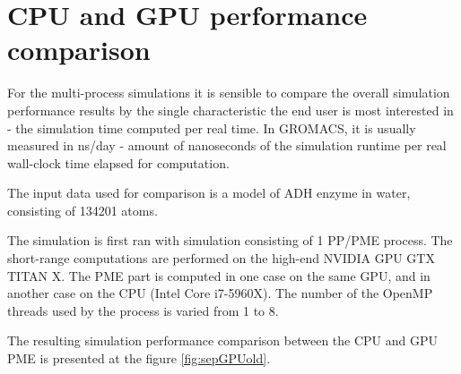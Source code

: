 \documentclass[12pt,a4paper]{report}
\begin{document}
\FloatBarrier

\section{CPU and GPU performance comparison}

For the multi-process simulations it is sensible to compare the overall simulation performance results by the single characteristic the end user is most interested in - the simulation time computed per real time. In GROMACS, it is usually measured in ns/day - amount of nanoseconds of the simulation runtime per real wall-clock time elapsed for computation.

The input data used for comparison is a model of ADH enzyme in water, consisting of 134201 atoms.

The simulation is first ran with simulation consisting of 1 PP/PME process. The short-range computations are performed on the high-end NVIDIA GPU GTX TITAN X.    
The PME part is computed in one case on the same GPU, and in another case on the CPU (Intel Core i7-5960X). The number of the OpenMP threads used by the process is varied from 1 to 8.
 
The resulting simulation performance comparison between the CPU and GPU PME is presented at the figure \ref{fig:sepGPUold}.
 
\end{document}

